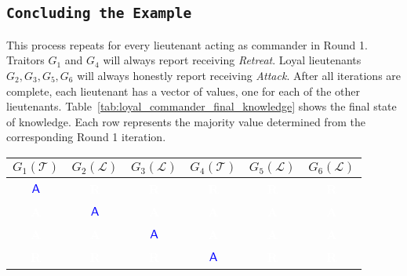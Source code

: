 \documentclass[11pt]{article}
\newcommand{\cmdA}{\ensuremath{\mathsf{A}}} %
\newcommand{\loyal}{\ensuremath{\mathcal{L}}}
\newcommand{\traitor}{\ensuremath{\mathcal{T}}}
\newcommand{\gen}[1]{\ensuremath{G_{#1}}}
\begin{document}
\subsection*{\texttt{\large Concluding the Example}}
\justifying
This process repeats for every lieutenant acting as commander in Round 1. Traitors $\gen{1}$ and $\gen{4}$ will always report receiving \textit{Retreat}. Loyal lieutenants $\gen{2}, \gen{3}, \gen{5}, \gen{6}$ will always honestly report receiving \textit{Attack}. After all iterations are complete, each lieutenant has a vector of values, one for each of the other lieutenants. Table~\ref{tab:loyal_commander_final_knowledge} shows the final state of knowledge. Each row represents the majority value determined from the corresponding Round 1 iteration.

\begin{center}
\vspace{1em} %
\renewcommand{\arraystretch}{1.5}
\setlength{\tabcolsep}{6pt} %
\begin{tabular}{c|c|c|c|c|c}
    \hline
    \textbf{$\gen{1}(\traitor)$} & \textbf{$\gen{2}(\loyal)$} & \textbf{$\gen{3}(\loyal)$} & \textbf{$\gen{4}(\traitor)$} & \textbf{$\gen{5}(\loyal)$} & \textbf{$\gen{6}(\loyal)$} \\
    \hline
    \cellcolor{yellow!30}\textbf{\textcolor{blue}{\cmdA}} & \cellcolor{red!75}\textbf{\textcolor{white}{R}} & \cellcolor{red!75}\textbf{\textcolor{white}{R}} & \cellcolor{red!75}\textbf{\textcolor{white}{R}} & \cellcolor{red!75}\textbf{\textcolor{white}{R}} & \cellcolor{red!75}\textbf{\textcolor{white}{R}} \\
    \hline
    \cellcolor{blue!75}\textbf{\textcolor{white}{A}} & \cellcolor{yellow!30}\textbf{\textcolor{blue}{\cmdA}} & \cellcolor{blue!75}\textbf{\textcolor{white}{A}} & \cellcolor{blue!75}\textbf{\textcolor{white}{A}} & \cellcolor{blue!75}\textbf{\textcolor{white}{A}} & \cellcolor{blue!75}\textbf{\textcolor{white}{A}} \\
    \hline
    \cellcolor{blue!75}\textbf{\textcolor{white}{A}} & \cellcolor{blue!75}\textbf{\textcolor{white}{A}} & \cellcolor{yellow!30}\textbf{\textcolor{blue}{\cmdA}} & \cellcolor{blue!75}\textbf{\textcolor{white}{A}} & \cellcolor{blue!75}\textbf{\textcolor{white}{A}} & \cellcolor{blue!75}\textbf{\textcolor{white}{A}} \\
    \hline
    \cellcolor{red!75}\textbf{\textcolor{white}{R}} & \cellcolor{red!75}\textbf{\textcolor{white}{R}} & \cellcolor{red!75}\textbf{\textcolor{white}{R}} & \cellcolor{yellow!30}\textbf{\textcolor{blue}{\cmdA}} & \cellcolor{red!75}\textbf{\textcolor{white}{R}} & \cellcolor{red!75}\textbf{\textcolor{white}{R}} \\

\end{tabular}
\end{center}
\end{document}
